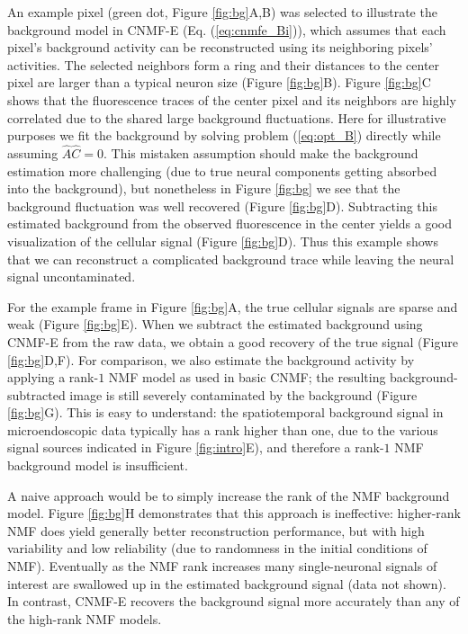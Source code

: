 \documentclass[9pt,lineno]{elife}
\begin{document}
An example pixel (green dot, Figure \ref{fig:bg}A,B) was selected to illustrate the background model in CNMF-E  (Eq. (\ref{eq:cnmfe_Bi})), which assumes that each pixel's background activity can be reconstructed using its neighboring pixels' activities. The selected neighbors form a ring and their distances to the center pixel are larger than a typical neuron size  (Figure \ref{fig:bg}B). Figure \ref{fig:bg}C shows that the fluorescence traces of the center pixel and its neighbors are highly correlated due to the shared large background fluctuations. Here for illustrative purposes we fit the background by solving problem (\ref{eq:opt_B}) directly while assuming $\hat{A}\hat{C}=0$. This mistaken assumption should make the background estimation more challenging (due to true neural components getting absorbed into the background), but nonetheless in Figure \ref{fig:bg} we see that the background fluctuation was well recovered (Figure \ref{fig:bg}D). Subtracting this estimated background from the observed fluorescence in the center yields a good visualization of the cellular signal (Figure \ref{fig:bg}D). Thus this example shows that we can reconstruct a complicated background trace while leaving the neural signal uncontaminated. 

For the example frame in Figure \ref{fig:bg}A, the true cellular signals are sparse and weak (Figure \ref{fig:bg}E). When we subtract the estimated background using CNMF-E from the raw data, we obtain a good recovery of the true signal (Figure \ref{fig:bg}D,F). For comparison, we also estimate the background activity by applying a rank-$1$  NMF model as used in basic CNMF; the resulting background-subtracted image is still severely contaminated by the background (Figure \ref{fig:bg}G). This is easy to understand: the spatiotemporal background signal in microendoscopic data typically has a rank higher than one, due to the various signal sources indicated in Figure \ref{fig:intro}E), and therefore a rank-$1$ NMF background model is insufficient. 

A naive approach would be to simply increase the rank of the NMF background model.  Figure \ref{fig:bg}H demonstrates that this approach is ineffective: higher-rank NMF does yield generally better reconstruction performance, but with high variability and low reliability (due to randomness in the initial conditions of NMF).  Eventually as the NMF rank increases many single-neuronal signals of interest are swallowed up in the estimated background signal (data not shown).  In contrast, CNMF-E recovers the background signal more accurately than any of the high-rank NMF models.
\end{document}
